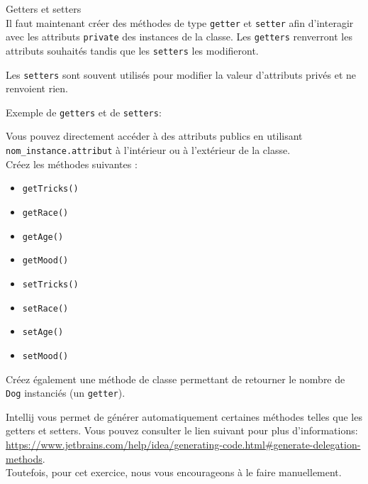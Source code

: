 \begin{Exercice}[10 minutes] Getters et setters\\
    Il faut maintenant créer des méthodes de type \lstinline{getter} et \lstinline{setter} afin d'interagir avec les attributs \lstinline{private} des instances de la classe. 
    Les \lstinline{getters} renverront les attributs souhaités tandis que les \lstinline{setters} les modifieront.

    Les \lstinline{setters} sont souvent utilisés pour modifier la valeur d'attributs privés et ne renvoient rien.
    \begin{conseil}
        Exemple de \lstinline{getters} et de \lstinline{setters}:
        
    \end{conseil} 

    Vous pouvez directement accéder à des attributs publics en utilisant \lstinline{nom_instance.attribut} à l'intérieur ou à l'extérieur de la classe. \\
    
    Créez les méthodes suivantes :
    \begin{itemize}
    \item \lstinline{getTricks()}
    \item \lstinline{getRace()}
    \item \lstinline{getAge()}
    \item \lstinline{getMood()}
    \item \lstinline{setTricks()}
    \item \lstinline{setRace()}
    \item \lstinline{setAge()}
    \item \lstinline{setMood()}
    \end{itemize}
    
    Créez également une méthode de classe permettant de retourner le nombre de \lstinline{Dog} instanciés (un \lstinline{getter}).
   	
\begin{conseil}
    Intellij vous permet de générer automatiquement certaines méthodes telles que les getters et setters. Vous pouvez consulter le lien suivant pour plus d'informations: \url{https://www.jetbrains.com/help/idea/generating-code.html\#generate-delegation-methods}.
    \\
    Toutefois, pour cet exercice, nous vous encourageons à le faire manuellement.
\end{conseil}
    
\begin{solution}
	
\end{solution}
\end{Exercice}

